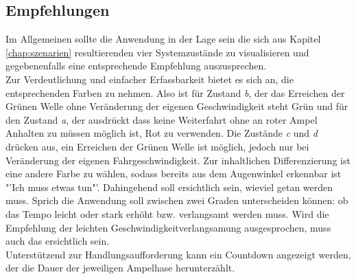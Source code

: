 \subsection{Empfehlungen}
Im Allgemeinen sollte die Anwendung in der Lage sein die sich aus Kapitel \ref{chap:szenarien} resultierenden vier Systemzustände zu visualisieren und gegebenenfalls eine entsprechende Empfehlung auszusprechen.\\
Zur Verdeutlichung und einfacher Erfassbarkeit bietet es sich an, die entsprechenden Farben zu nehmen. Also ist für Zustand \textit{b}, der das Erreichen der Grünen Welle ohne Veränderung der eigenen Geschwindigkeit steht Grün und für den Zustand \textit{a}, der ausdrückt dass keine Weiterfahrt ohne an roter Ampel Anhalten zu müssen möglich ist, Rot zu verwenden.
Die Zustände \textit{c} und \textit{d} drücken aus, ein Erreichen der Grünen Welle ist möglich, jedoch nur bei Veränderung der eigenen Fahrgeschwindigkeit. Zur inhaltlichen Differenzierung ist eine andere Farbe zu wählen, sodass bereits aus dem Augenwinkel erkennbar ist "'Ich muss etwas tun"'. Dahingehend soll ersichtlich sein, wieviel getan werden muss. Sprich die Anwendung soll zwischen zwei Graden unterscheiden können: ob das Tempo leicht oder stark erhöht bzw. verlangsamt werden muss. Wird die Empfehlung der leichten Geschwindigkeitverlangsamung ausgesprochen, muss auch das ersichtlich sein.\\
Unterstützend zur Handlungsaufforderung kann ein Countdown angezeigt werden, der die Dauer der jeweiligen Ampelhase herunterzählt. 
